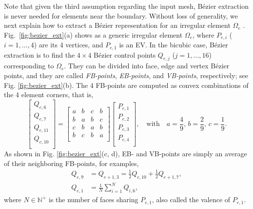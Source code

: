 \documentclass[graybox]{svmult}
\begin{document}
Note that given the third assumption regarding the input mesh, B\'ezier extraction is never needed for elements near the boundary. Without loss of generality, we next explain how to extract a B\'{e}zier representation for an irregular element $\Omega_e$ \cite{ref:scott13}.  Fig.~\ref{fig:bezier_ext}(a) shows as a generic irregular element $\Omega_e$, where $P_{e,i}$ ($i=1,\ldots,4$) are its 4 vertices, and $P_{e,1}$ is an EV. In the bicubic case, B\'{e}zier extraction is to find the $4\times 4$ B\'{e}zier control points $Q_{e,j}$ ($j=1,\ldots,16$) corresponding to $\Omega_e$. They can be divided into face, edge and vertex B\'{e}zier points, and they are called \emph{FB-points}, \emph{EB-points}, and \emph{VB-points}, respectively; see Fig. \ref{fig:bezier_ext}(b). The 4 FB-points are computed as convex combinations of the 4 element corners, that is,
\begin{equation}
\begin{bmatrix}
Q_{e,6} \\ Q_{e,7} \\ Q_{e,11} \\ Q_{e,10} \\
\end{bmatrix} =
\begin{bmatrix}
a & b & c & b \\
b & a & b & c \\
c & b & a & b \\
b & c & b & a \\
\end{bmatrix}
\begin{bmatrix}
P_{e,1} \\ P_{e,2} \\ P_{e,3} \\ P_{e,4} \\
\end{bmatrix} , \quad \text{with} \quad a=\frac{4}{9},\, b=\frac{2}{9},\, c=\frac{1}{9}.
\label{eq:face_pt}
\end{equation}
As shown in Fig. \ref{fig:bezier_ext}(c, d), EB- and VB-points are simply an average of their neighboring FB-points, for examples,
\begin{equation}
\begin{aligned}
Q_{e,9} &= Q_{e+1,3} = \frac{1}{2} Q_{e,10} + \frac{1}{2} Q_{e+1,7}, \\
Q_{e,1} &= \frac{1}{N} \sum_{i=1}^{N} Q_{i,6},
\end{aligned}
\label{eq:edge_vertex_pt}
\end{equation}
where $N\in\mathbb{N}^+$ is the number of faces sharing $P_{e,1}$, also called the valence of $P_{e,1}$.
\end{document}
